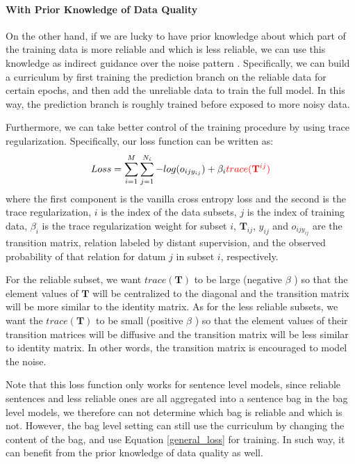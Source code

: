 \paragraph{With Prior Knowledge of Data Quality}
On the other hand, if we are lucky to have prior knowledge about which part of the training data is more reliable and which is less reliable, we can use this knowledge as indirect guidance over the noise pattern . Specifically, we can build a curriculum by first training the prediction branch on the reliable data for certain epochs, and then add the unreliable data to train the full model. In this way, the prediction branch is roughly trained before exposed to more noisy data.

Furthermore, we can take better control of the training procedure by using trace regularization.
Specifically, our loss function can be written as:
%
\begin{equation}
\begin{aligned}
Loss=\sum_{i=1}^M{\sum_{j=1}^{N_i}{-log(o_{ijy_{ij}})}} + \beta_i \textcolor{red}{trace(\mathbf{T}^{ij})}
\end{aligned}
\end{equation}
where the first component is the vanilla cross entropy loss  and the second is the trace regularization, $i$ is the index of the data subsets, $j$ is the index of training data, $\beta_i$ is the trace regularization weight for subset $i$, $\mathbf{T}_{ij}$, $y_{ij}$ and $o_{ijy_{ij}}$ are the transition matrix, relation labeled by distant supervision, and the observed probability of that relation for datum $j$ in subset $i$, respectively.

For the reliable subset, we want $trace(\mathbf{T})$ to be large (negative $\beta$ ) so that the element values of $\mathbf{T}$ will be centralized to the diagonal and the transition matrix will be more similar to the identity matrix. As for the  less reliable subsets, we want the $trace(\mathbf{T})$ to be small (positive $\beta$ ) so that the element values of their transition matrices will be diffusive and the transition matrix will be less similar to identity matrix. In other words, the transition matrix is encouraged to model the noise.

Note that this loss function only works for sentence level models, since reliable sentences and less reliable ones are all aggregated into a sentence bag in the bag level models,  we therefore can not determine which bag is reliable and which is not. However, the bag level setting can still use the curriculum by changing the content of the bag,   and use Equation \ref{general_loss} for training. In such way, it can benefit from the prior knowledge of data quality as well.




